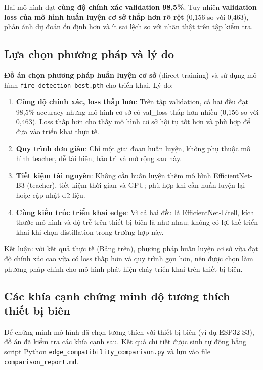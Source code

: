 \documentclass[12pt,a4paper]{report}
\begin{document}
Hai mô hình đạt \textbf{cùng độ chính xác validation 98{,}5\%}. Tuy nhiên \textbf{validation loss của mô hình huấn luyện cơ sở thấp hơn rõ rệt} (0{,}156 so với 0{,}463), phản ánh dự đoán ổn định hơn và ít sai lệch so với nhãn thật trên tập kiểm tra.

\subsection{Lựa chọn phương pháp và lý do}

\textbf{Đồ án chọn phương pháp huấn luyện cơ sở} (direct training) và sử dụng mô hình \texttt{fire\_detection\_best.pth} cho triển khai. Lý do:

\begin{enumerate}
  \item \textbf{Cùng độ chính xác, loss thấp hơn}: Trên tập validation, cả hai đều đạt 98{,}5\% accuracy nhưng mô hình cơ sở có val\_loss thấp hơn nhiều (0{,}156 so với 0{,}463). Loss thấp hơn cho thấy mô hình cơ sở hội tụ tốt hơn và phù hợp để đưa vào triển khai thực tế.
  \item \textbf{Quy trình đơn giản}: Chỉ một giai đoạn huấn luyện, không phụ thuộc mô hình teacher, dễ tái hiện, bảo trì và mở rộng sau này.
  \item \textbf{Tiết kiệm tài nguyên}: Không cần huấn luyện thêm mô hình EfficientNet-B3 (teacher), tiết kiệm thời gian và GPU; phù hợp khi cần huấn luyện lại hoặc cập nhật dữ liệu.
  \item \textbf{Cùng kiến trúc triển khai edge}: Vì cả hai đều là EfficientNet-Lite0, kích thước mô hình và độ trễ trên thiết bị biên là như nhau; không có lợi thế triển khai khi chọn distillation trong trường hợp này.
\end{enumerate}

Kết luận: với kết quả thực tế (Bảng trên), phương pháp huấn luyện cơ sở vừa đạt độ chính xác cao vừa có loss thấp hơn và quy trình gọn hơn, nên được chọn làm phương pháp chính cho mô hình phát hiện cháy triển khai trên thiết bị biên.

\subsection{Các khía cạnh chứng minh độ tương thích thiết bị biên}

Để chứng minh mô hình đã chọn tương thích với thiết bị biên (ví dụ ESP32-S3), đồ án đã kiểm tra các khía cạnh sau. Kết quả chi tiết được sinh tự động bằng script Python \texttt{edge\_compatibility\_comparison.py} và lưu vào file \texttt{comparison\_report.md}.
\end{document}
